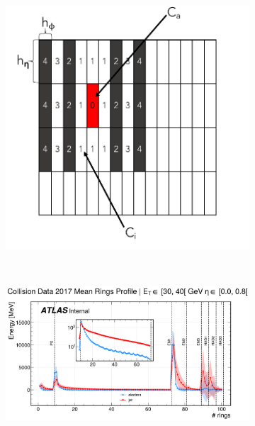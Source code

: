\begin{figure}[!ht]
  \begin{center}
  \begin{subfigure}[c]{.48\textwidth}
  \centering
  \includegraphics[width=\textwidth]{sections/ringer/figures/reco_steps/ring_em1_mask.pdf}
  \end{subfigure}\\
  \centering
  \begin{subfigure}[c]{.7\textwidth}
  \centering
  \includegraphics[width=\textwidth]{sections/ringer/figures/reco_steps/data17_zee_mean_rings_profiles_et2_eta0.png}
  \end{subfigure}



\end{center}
\end{figure}
